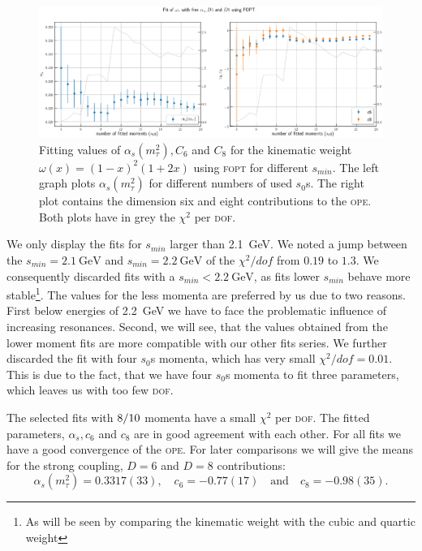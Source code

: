 \documentclass[../../index.tex]{subfiles}
\begin{document}
\begin{figure}
  \centering \includegraphics[width=\textwidth]{./images/fitWKinAlD6D8.eps}
  \caption{Fitting values of \(\alpha_s(m_\tau^2), C_6\) and \(C_8\) for the
    kinematic weight \(\omega(x)=(1-x)^2(1+2x)\) using \textsc{fopt} for
    different \(s_{min}\). The left graph plots \(\alpha_s(m_\tau^2)\) for
    different numbers of used \(s_0\)s. The right plot contains the dimension
    six and eight contributions to the \textsc{ope}. Both plots have in grey the
    \(\chi^2\) per \textsc{dof}.}
  \label{fig:fitWKinAlD6D8}
\end{figure}

We only display the fits for \(s_{min}\) larger than \SI{2.1}{\giga\eV}. We
noted a jump between the \(s_{min}=\SI{2.1}{\giga\eV}\) and
\(s_{min}=\SI{2.2}{\giga\eV}\) of the \(\chi^2/dof\) from \(0.19\) to \(1.3\).
We consequently discarded fits with a \(s_{min}<\SI{2.2}{\giga\eV}\), as fits
lower \(s_{min}\) behave more stable\footnote{As will be seen by comparing the
  kinematic weight with the cubic and quartic weight}. The values for the less
momenta are preferred by us due to two reasons. First below energies of
\SI{2.2}{\giga\eV} we have to face the problematic influence of increasing
resonances. Second, we will see, that the values obtained from the lower moment
fits are more compatible with our other fits series. We further discarded the
fit with four \(s_0\)s momenta, which has very small \(\chi^2/dof=0.01\). This
is due to the fact, that we have four \(s_0\)s momenta to fit three parameters,
which leaves us with too few \textsc{dof}.

The selected fits with \(8\-/10\) momenta have a small \(\chi^2\) per
\textsc{dof}. The fitted parameters, \(\alpha_s, c_6\) and \(c_8\) are in good
agreement with each other. For all fits we have a good convergence of the
\textsc{ope}. For later comparisons we will give the means for the strong
coupling, \(D=6\) and \(D=8\) contributions:
\begin{equation}
  \label{eq:wKinResult}
  \alpha_s(m_\tau^2) = 0.3317(33), \quad c_6 = -0.77(17) \quad \text{and} \quad
  c_8 = -0.98(35).
\end{equation}
\end{document}
